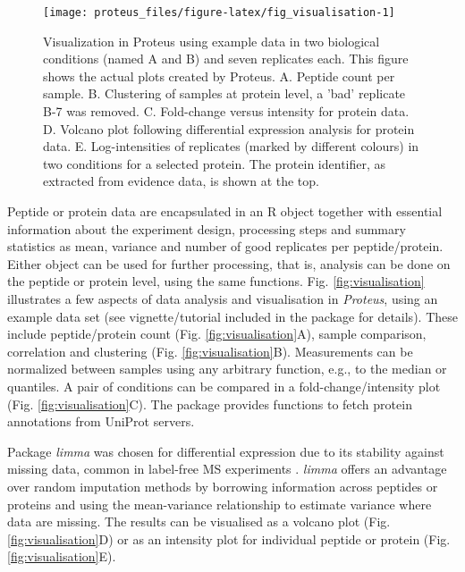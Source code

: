 \documentclass[]{article}
\begin{document}
\begin{figure}[H]

{\centering \texttt{[image: proteus\_files/figure-latex/fig\_visualisation-1]} 

}

\caption{\label{fig:visualisation}Visualization in Proteus using example data in two biological conditions (named A and B) and seven replicates each. This figure shows the actual plots created by Proteus. A. Peptide count per sample. B. Clustering of samples at protein level, a 'bad' replicate B-7 was removed. C. Fold-change versus intensity for protein data. D. Volcano plot following differential expression analysis for protein data. E. Log-intensities of replicates (marked by different colours) in two conditions for a selected protein. The protein identifier, as extracted from evidence data, is shown at the top.}\label{fig:fig_visualisation}
\end{figure}

Peptide or protein data are encapsulated in an R object together with
essential information about the experiment design, processing steps and
summary statistics as mean, variance and number of good replicates per
peptide/protein. Either object can be used for further processing, that
is, analysis can be done on the peptide or protein level, using the same
functions. Fig. \ref{fig:visualisation} illustrates a few aspects of
data analysis and visualisation in \emph{Proteus}, using an example data
set (see vignette/tutorial included in the package for details). These
include peptide/protein count (Fig. \ref{fig:visualisation}A), sample
comparison, correlation and clustering (Fig. \ref{fig:visualisation}B).
Measurements can be normalized between samples using any arbitrary
function, e.g., to the median or quantiles. A pair of conditions can be
compared in a fold-change/intensity plot (Fig.
\ref{fig:visualisation}C). The package provides functions to fetch
protein annotations from UniProt servers.

Package \emph{limma} was chosen for differential expression due to its
stability against missing data, common in label-free MS experiments
\citep{lazar2016}. \emph{limma} offers an advantage over random
imputation methods by borrowing information across peptides or proteins
and using the mean-variance relationship to estimate variance where data
are missing. The results can be visualised as a volcano plot (Fig.
\ref{fig:visualisation}D) or as an intensity plot for individual peptide
or protein (Fig. \ref{fig:visualisation}E).
\end{document}

